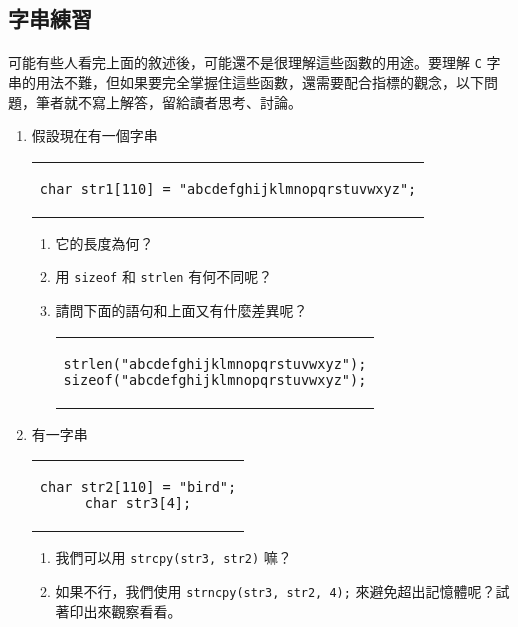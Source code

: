 \documentclass[12pt,a4paper,oneside]{report}
\begin{document}
\begin{CJK}{UTF8}{bkai}
\subsection{字串練習}

\paragraph{}可能有些人看完上面的敘述後，可能還不是很理解這些函數的用途。要理解 \texttt{C} 字串的用法不難，但如果要完全掌握住這些函數，還需要配合指標的觀念，以下問題，筆者就不寫上解答，留給讀者思考、討論。

\begin{enumerate}
\item 假設現在有一個字串
\begin{code}[h!]
  \centering
  \begin{tabular}{c}
  \begin{lstlisting}
char str1[110] = "abcdefghijklmnopqrstuvwxyz";
  \end{lstlisting}
  \end{tabular}
\end{code}
  \begin{enumerate}
  \item 它的長度為何？
  \item 用 \lstinline!sizeof! 和 \lstinline!strlen! 有何不同呢？
  \item 請問下面的語句和上面又有什麼差異呢？
  \begin{code}[h!]
    \centering
    \begin{tabular}{c}
    \begin{lstlisting}
strlen("abcdefghijklmnopqrstuvwxyz");
sizeof("abcdefghijklmnopqrstuvwxyz");
    \end{lstlisting}
    \end{tabular}
  \end{code}
  \end{enumerate}
\item 有一字串
\begin{code}[h!]
  \centering
  \begin{tabular}{c}
  \begin{lstlisting}
char str2[110] = "bird";
char str3[4];
  \end{lstlisting}
  \end{tabular}
\end{code}
  \begin{enumerate}
  \item 我們可以用 \lstinline!strcpy(str3, str2)! 嘛？
  \item 如果不行，我們使用 \lstinline!strncpy(str3, str2, 4);! 來避免超出記憶體呢？試著印出來觀察看看。

\end{enumerate}
\end{enumerate}
\end{CJK}
\end{document}
